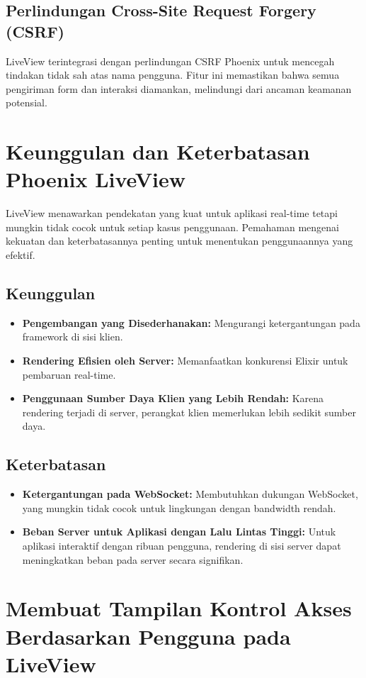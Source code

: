 \subsection{Perlindungan Cross-Site Request Forgery (CSRF)}
LiveView terintegrasi dengan perlindungan CSRF Phoenix untuk mencegah tindakan tidak sah atas nama pengguna. Fitur ini memastikan bahwa semua pengiriman form dan interaksi diamankan, melindungi dari ancaman keamanan potensial.

\section{Keunggulan dan Keterbatasan Phoenix LiveView}
LiveView menawarkan pendekatan yang kuat untuk aplikasi real-time tetapi mungkin tidak cocok untuk setiap kasus penggunaan. Pemahaman mengenai kekuatan dan keterbatasannya penting untuk menentukan penggunaannya yang efektif.

\subsection{Keunggulan}
\begin{itemize}
	\item \textbf{Pengembangan yang Disederhanakan:} Mengurangi ketergantungan pada framework di sisi klien.
	\item \textbf{Rendering Efisien oleh Server:} Memanfaatkan konkurensi Elixir untuk pembaruan real-time.
	\item \textbf{Penggunaan Sumber Daya Klien yang Lebih Rendah:} Karena rendering terjadi di server, perangkat klien memerlukan lebih sedikit sumber daya.
\end{itemize}

\subsection{Keterbatasan}
\begin{itemize}
	\item \textbf{Ketergantungan pada WebSocket:} Membutuhkan dukungan WebSocket, yang mungkin tidak cocok untuk lingkungan dengan bandwidth rendah.
	\item \textbf{Beban Server untuk Aplikasi dengan Lalu Lintas Tinggi:} Untuk aplikasi interaktif dengan ribuan pengguna, rendering di sisi server dapat meningkatkan beban pada server secara signifikan.
\end{itemize}

\section{Membuat Tampilan Kontrol Akses Berdasarkan Pengguna pada LiveView}

